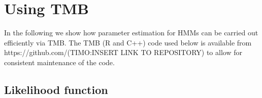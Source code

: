 \documentclass[bimj,fleqn]{w-art}\usepackage[]{graphicx}\usepackage[]{color}
\theoremstyle{plain}
\theoremstyle{definition}
\begin{document}
% 
% 
% 
% 
% 
% 
% 
% 
% 


\section{Using TMB}
\label{sec:tmb}

In the following we show how parameter estimation for HMMs can be carried out  efficiently via TMB. The TMB (R and C++) code used below is available from
https://github.com/(TIMO:INSERT LINK TO REPOSITORY) to allow for consistent maintenance of the code. 

\subsection{Likelihood function}
\label{sec:tmb_cpp}
\end{document}
